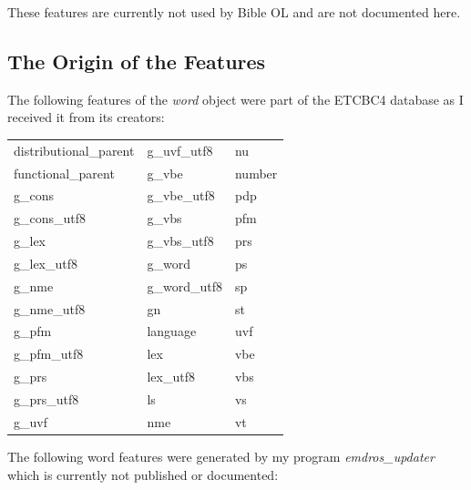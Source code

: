 \documentclass[11pt,oneside,a4paper]{memoir}
\begin{document}
These features are currently not used by Bible OL and are not documented here.

\subsection{The Origin of the Features}\label{etcbc-origin}

The following features of the \emph{word} object were part of the ETCBC4 database as I received it
from its creators:

\begin{center}
  \begin{tabular}{lll}
    distributional\_parent & g\_uvf\_utf8  & nu    \\
    functional\_parent     & g\_vbe        & number\\
    g\_cons                & g\_vbe\_utf8  & pdp   \\
    g\_cons\_utf8          & g\_vbs        & pfm   \\
    g\_lex                 & g\_vbs\_utf8  & prs   \\
    g\_lex\_utf8           & g\_word       & ps    \\
    g\_nme                 & g\_word\_utf8 & sp    \\
    g\_nme\_utf8           & gn            & st    \\
    g\_pfm                 & language      & uvf   \\
    g\_pfm\_utf8           & lex           & vbe   \\
    g\_prs                 & lex\_utf8     & vbs   \\
    g\_prs\_utf8           & ls            & vs    \\
    g\_uvf                 & nme           & vt    \\
  \end{tabular}
\end{center}

The following word features were generated by my program \emph{emdros\_updater} which is currently
not published or documented:
\end{document}
